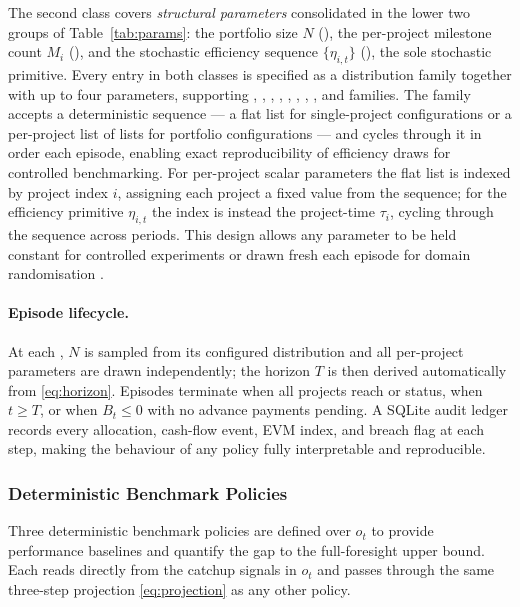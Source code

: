 The second class covers \emph{structural parameters} consolidated in
the lower two groups of Table~\ref{tab:params}: the portfolio size $N$
(), the per-project milestone count $M_i$
(), and the stochastic efficiency sequence
$\{\eta_{i,t}\}$ (), the sole stochastic primitive.
Every entry in both classes
is specified as a distribution family together with up to four
parameters, supporting ,
, , ,
, ,
, , and
 families. The  family
accepts a deterministic sequence --- a flat list for single-project
configurations or a per-project list of lists for portfolio
configurations --- and cycles through it in order each episode,
enabling exact reproducibility of efficiency draws for controlled
benchmarking. For per-project scalar parameters the flat list is
indexed by project index $i$, assigning each project a fixed value
from the sequence; for the efficiency primitive $\eta_{i,t}$ the
index is instead the project-time $\tau_i$, cycling through the
sequence across periods. This design allows any parameter to be held constant
for controlled experiments or drawn fresh each episode for domain
randomisation \citep{Tobin2017}.

\paragraph{Episode lifecycle.}
At each , $N$ is sampled from its configured
distribution and all per-project parameters are drawn independently;
the horizon $T$ is then derived automatically from \eqref{eq:horizon}.
Episodes terminate when all projects reach  or
 status, when $t \geq T$, or when $B_t \leq 0$
with no advance payments pending. A SQLite audit ledger records every
allocation, cash-flow event, EVM index, and breach flag at each step,
making the behaviour of any policy fully interpretable and
reproducible.

\subsubsection{Deterministic Benchmark Policies}
\label{subsubsec:baselines}

Three deterministic benchmark policies are defined over $o_t$ to
provide performance baselines and quantify the gap to the
full-foresight upper bound. Each reads directly from the catchup
signals in $o_t$ and passes through the same three-step projection
\eqref{eq:projection} as any other policy.

